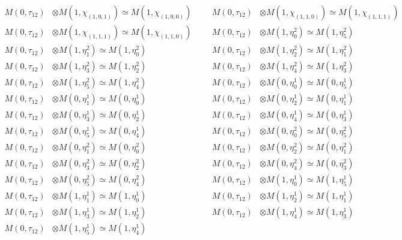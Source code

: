 \begin{align*}
M(0,\tau_{12}) &\otimes M(1,\chi_{(1,0,1)}) \simeq M(1,\chi_{(1,0,0)}) &&& M(0,\tau_{12}) &\otimes M(1,\chi_{(1,1,0)}) \simeq M(1,\chi_{(1,1,1)})\\
M(0,\tau_{12}) &\otimes M(1,\chi_{(1,1,1)}) \simeq M(1,\chi_{(1,1,0)}) &&& M(0,\tau_{12}) &\otimes M(1,\eta^{2}_{0}) \simeq M(1,\eta^{2}_{5})\\
M(0,\tau_{12}) &\otimes M(1,\eta^{2}_{1}) \simeq M(1,\eta^{2}_{0}) &&& M(0,\tau_{12}) &\otimes M(1,\eta^{2}_{2}) \simeq M(1,\eta^{2}_{1})\\
M(0,\tau_{12}) &\otimes M(1,\eta^{2}_{3}) \simeq M(1,\eta^{2}_{2}) &&& M(0,\tau_{12}) &\otimes M(1,\eta^{2}_{4}) \simeq M(1,\eta^{2}_{3})\\
M(0,\tau_{12}) &\otimes M(1,\eta^{2}_{5}) \simeq M(1,\eta^{2}_{4}) &&& M(0,\tau_{12}) &\otimes M(0,\eta^{1}_{0}) \simeq M(0,\eta^{1}_{5})\\
M(0,\tau_{12}) &\otimes M(0,\eta^{1}_{1}) \simeq M(0,\eta^{1}_{0}) &&& M(0,\tau_{12}) &\otimes M(0,\eta^{1}_{2}) \simeq M(0,\eta^{1}_{1})\\
M(0,\tau_{12}) &\otimes M(0,\eta^{1}_{3}) \simeq M(0,\eta^{1}_{2}) &&& M(0,\tau_{12}) &\otimes M(0,\eta^{1}_{4}) \simeq M(0,\eta^{1}_{3})\\
M(0,\tau_{12}) &\otimes M(0,\eta^{1}_{5}) \simeq M(0,\eta^{1}_{4}) &&& M(0,\tau_{12}) &\otimes M(0,\eta^{2}_{0}) \simeq M(0,\eta^{2}_{5})\\
M(0,\tau_{12}) &\otimes M(0,\eta^{2}_{1}) \simeq M(0,\eta^{2}_{0}) &&& M(0,\tau_{12}) &\otimes M(0,\eta^{2}_{2}) \simeq M(0,\eta^{2}_{1})\\
M(0,\tau_{12}) &\otimes M(0,\eta^{2}_{3}) \simeq M(0,\eta^{2}_{2}) &&& M(0,\tau_{12}) &\otimes M(0,\eta^{2}_{4}) \simeq M(0,\eta^{2}_{3})\\
M(0,\tau_{12}) &\otimes M(0,\eta^{2}_{5}) \simeq M(0,\eta^{2}_{4}) &&& M(0,\tau_{12}) &\otimes M(1,\eta^{1}_{0}) \simeq M(1,\eta^{1}_{5})\\
M(0,\tau_{12}) &\otimes M(1,\eta^{1}_{1}) \simeq M(1,\eta^{1}_{0}) &&& M(0,\tau_{12}) &\otimes M(1,\eta^{1}_{2}) \simeq M(1,\eta^{1}_{1})\\
M(0,\tau_{12}) &\otimes M(1,\eta^{1}_{3}) \simeq M(1,\eta^{1}_{2}) &&& M(0,\tau_{12}) &\otimes M(1,\eta^{1}_{4}) \simeq M(1,\eta^{1}_{3})\\
M(0,\tau_{12}) &\otimes M(1,\eta^{1}_{5}) \simeq M(1,\eta^{1}_{4})
\end{align*}

